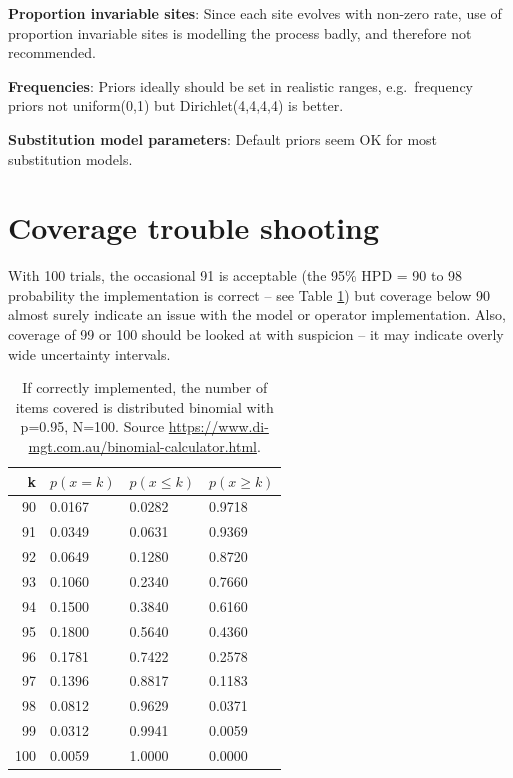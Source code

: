 \documentclass[oneside]{article}
\begin{document}
{\bf Proportion invariable sites}\label{proportion-invariable-sites}:
Since each site evolves with non-zero rate, use of proportion invariable
sites is modelling the process badly, and therefore not recommended.

{\bf Frequencies}\label{frequencies}:
Priors ideally should be set in realistic ranges, e.g.~frequency priors
not uniform(0,1) but Dirichlet(4,4,4,4) is better.

{\bf Substitution model parameters}\label{substitution-model-parameters}:
Default priors seem OK for most substitution models.



\section{Coverage trouble shooting}\label{trouble-shooting}

With 100 trials, the occasional 91 is acceptable (the 95\% HPD = 90 to 98 probability the
implementation is correct -- see Table \ref{tab:coverage}) but coverage below 90 almost surely indicate
an issue with the model or operator implementation. Also, coverage of 99
or 100 should be looked at with suspicion -- it may indicate overly wide
uncertainty intervals.


\begin{table}
\begin{center}
\begin{tabular}{rlll}
\hline
k & $p(x=k)$ & $p(x\le k)$ & $p(x\ge k)$\\
\hline
90 & 0.0167 & 0.0282 & 0.9718\\
91 & 0.0349 & 0.0631 & 0.9369\\
92 & 0.0649 & 0.1280 & 0.8720\\
93 & 0.1060 & 0.2340 & 0.7660\\
94 & 0.1500 & 0.3840 & 0.6160\\
95 & 0.1800 & 0.5640 & 0.4360\\
96 & 0.1781 & 0.7422 & 0.2578\\
97 & 0.1396 & 0.8817 & 0.1183\\
98 & 0.0812 & 0.9629 & 0.0371\\
99 & 0.0312 & 0.9941 & 0.0059\\
100 & 0.0059 & 1.0000 & 0.0000\\
\hline
\end{tabular}
\end{center}
\caption{If correctly implemented, the number of items covered is distributed binomial with p=0.95, N=100.
Source \url{https://www.di-mgt.com.au/binomial-calculator.html}.
\label{tab:coverage}}
\end{table}
\end{document}
